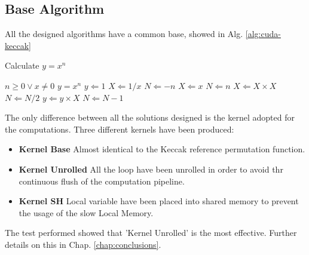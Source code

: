 \subsection{Base Algorithm}
All the designed algorithms have a common base, showed in Alg. \ref{alg:cuda-keccak}
\begin{algorithm}                      %
\caption{Calculate $y = x^n$}          %
\label{alg:cuda-keccak}                %
\begin{algorithmic}                    %
\REQUIRE $n \geq 0 \vee x \neq 0$
\ENSURE $y = x^n$
\STATE $y \Leftarrow 1$
\STATE $X \Leftarrow 1 / x$
\STATE $N \Leftarrow -n$
\ELSE
\STATE $X \Leftarrow x$
\STATE $N \Leftarrow n$
\ENDIF
{}
\STATE $X \Leftarrow X \times X$
\STATE $N \Leftarrow N / 2$
\ELSE[$N$ is odd]
\STATE $y \Leftarrow y \times X$
\STATE $N \Leftarrow N - 1$
\ENDIF
\ENDWHILE
\end{algorithmic}
\end{algorithm}
The only difference between all the solutions designed is the kernel adopted for the computations. Three different kernels have been produced:\\
\begin{itemize}
\item \textbf{Kernel Base} Almost identical to the Keccak reference permutation function.
\item \textbf{Kernel Unrolled} All the loop have been unrolled in order to avoid thr continuous flush of the computation pipeline.
\item \textbf{Kernel SH} Local variable have been placed into shared memory to prevent the usage of the slow Local Memory.
\end{itemize}
The test performed showed that 'Kernel Unrolled' is the most effective. Further details on this in Chap. \ref{chap:conclusions}.

